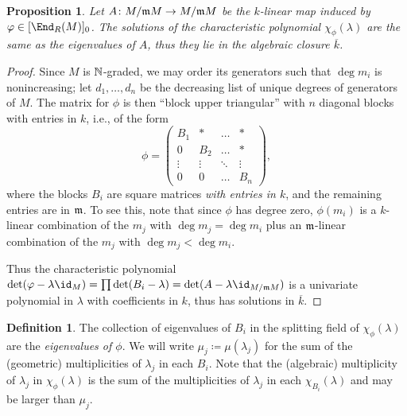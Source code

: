 \documentclass[12pt]{article}
\let\bar\overline
\theoremstyle{theorem}
\numberwithin{thm}{section}
\newtheorem{prop}[thm]{Proposition}
\theoremstyle{definition}
\newtheorem{dfn}[thm]{Definition}
\begin{document}
\begin{prop}\label{prop:eigenvalues}
  Let $A\colon M/\mathfrak m M\to M/\mathfrak m M$ be the $k$-linear map induced by $\phi\in[\End_R(M)]_0$. The solutions of the characteristic polynomial $\chi_\phi(\lambda)$ are the same as the eigenvalues of $A$, thus they lie in the algebraic closure $\bar k$.
\end{prop}
\begin{proof}
  Since $M$ is $\mathbb N$-graded, we may order its generators such that $\deg m_i$ is nonincreasing; let $d_1,\dots,d_n$ be the decreasing list of unique degrees of generators of $M$. The matrix for $\phi$ is then ``block upper triangular'' with $n$ diagonal blocks with entries in $k$, i.e., of the form
  \begin{equation}\label{eq:blocks}
    \phi = \begin{pmatrix}
    B_1    & *      & \dots  & *      \\
    0      & B_2    & \dots  & *      \\
    \vdots & \vdots & \ddots & \vdots \\
    0      & 0      & \dots  & B_n
    \end{pmatrix},
  \end{equation}
  where the blocks $B_i$ are square matrices \emph{with entries in $k$}, and the remaining entries are in $\mathfrak m$. To see this, note that since $\phi$ has degree zero, $\phi(m_i)$ is a $k$-linear combination of the $m_j$ with $\deg m_j = \deg m_i$ plus an $\mathfrak m$-linear combination of the $m_j$ with $\deg m_j < \deg m_i$. %

  Thus the characteristic polynomial $\det(\phi - \lambda \id_M) = \prod \det(B_i - \lambda) = \det(A - \lambda \id_{M/\m M})$ is a univariate polynomial in $\lambda$ with coefficients in $k$, thus has solutions in $\bar k$.
\end{proof}

\begin{dfn}\label{def:eigenvalues}
  The collection of eigenvalues of $B_i$ in the splitting field of $\chi_\phi(\lambda)$ are the \emph{eigenvalues of $\phi$}. We will write $\mu_j \coloneqq \mu(\lambda_j)$ for the sum of the (geometric) multiplicities of $\lambda_j$ in each $B_i$. Note that the (algebraic) multiplicity of $\lambda_j$ in $\chi_\phi(\lambda)$ is the sum of the multiplicities of $\lambda_j$ in each $\chi_{B_i}(\lambda)$ and may be larger than $\mu_j$.
\end{dfn}
\end{document}
